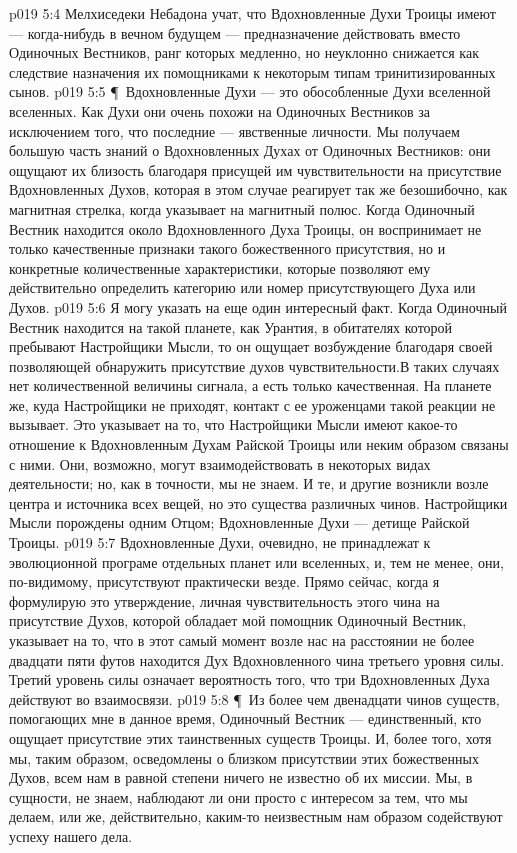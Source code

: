 \vs p019 5:4 Мелхиседеки Небадона учат, что Вдохновленные Духи Троицы имеют --- когда\hyp{}нибудь в вечном будущем --- предназначение действовать вместо Одиночных Вестников, ранг которых медленно, но неуклонно снижается как следствие назначения их помощниками к некоторым типам тринитизированных сынов.
\vs p019 5:5 \P\ Вдохновленные Духи --- это обособленные Духи вселенной вселенных. Как Духи они очень похожи на Одиночных Вестников за исключением того, что последние --- явственные личности. Мы получаем большую часть знаний о Вдохновленных Духах от Одиночных Вестников: они ощущают их близость благодаря присущей им чувствительности на присутствие Вдохновленных Духов, которая в этом случае реагирует так же безошибочно, как магнитная стрелка, когда указывает на магнитный полюс. Когда Одиночный Вестник находится около Вдохновленного Духа Троицы, он воспринимает не только качественные признаки такого божественного присутствия, но и конкретные количественные характеристики, которые позволяют ему действительно определить категорию или номер присутствующего Духа или Духов.
\vs p019 5:6 Я могу указать на еще один интересный факт. Когда Одиночный Вестник находится на такой планете, как Урантия, в обитателях которой пребывают Настройщики Мысли, то он ощущает возбуждение благодаря своей позволяющей обнаружить присутствие духов чувствительности.В таких случаях нет количественной величины сигнала, а есть только качественная. На планете же, куда Настройщики не приходят, контакт с ее уроженцами такой реакции не вызывает. Это указывает на то, что Настройщики Мысли имеют какое\hyp{}то отношение к Вдохновленным Духам Райской Троицы или неким образом связаны с ними. Они, возможно, могут взаимодействовать в некоторых видах деятельности; но, как в точности, мы не знаем. И те, и другие возникли возле центра и источника всех вещей, но это существа различных чинов. Настройщики Мысли порождены одним Отцом; Вдохновленные Духи --- детище Райской Троицы.
\vs p019 5:7 Вдохновленные Духи, очевидно, не принадлежат к эволюционной програме отдельных планет или вселенных, и, тем не менее, они, по\hyp{}видимому, присутствуют практически везде. Прямо сейчас, когда я формулирую это утверждение, личная чувствительность этого чина на присутствие Духов, которой обладает мой помощник Одиночный Вестник, указывает на то, что в этот самый момент возле нас на расстоянии не более двадцати пяти футов находится Дух Вдохновленного чина третьего уровня силы. Третий уровень силы означает вероятность того, что три Вдохновленных Духа действуют во взаимосвязи.
\vs p019 5:8 \P\ Из более чем двенадцати чинов существ, помогающих мне в данное время, Одиночный Вестник --- единственный, кто ощущает присутствие этих таинственных существ Троицы. И, более того, хотя мы, таким образом, осведомлены о близком присутствии этих божественных Духов, всем нам в равной степени ничего не известно об их миссии. Мы, в сущности, не знаем, наблюдают ли они просто с интересом за тем, что мы делаем, или же, действительно, каким\hyp{}то неизвестным нам образом содействуют успеху нашего дела.
